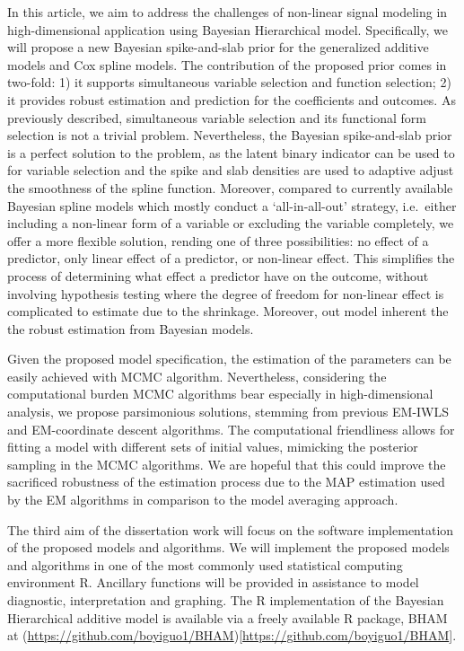 \documentclass[AMA,STIX1COL,]{WileyNJD-v2}
\begin{document}
In this article, we aim to address the challenges of non-linear signal
modeling in high-dimensional application using Bayesian Hierarchical
model. Specifically, we will propose a new Bayesian spike-and-slab prior
for the generalized additive models and Cox spline models. The
contribution of the proposed prior comes in two-fold: 1) it supports
simultaneous variable selection and function selection; 2) it provides
robust estimation and prediction for the coefficients and outcomes. As
previously described, simultaneous variable selection and its functional
form selection is not a trivial problem. Nevertheless, the Bayesian
spike-and-slab prior is a perfect solution to the problem, as the latent
binary indicator can be used to for variable selection and the spike and
slab densities are used to adaptive adjust the smoothness of the spline
function. Moreover, compared to currently available Bayesian spline
models which mostly conduct a `all-in-all-out' strategy, i.e.~either
including a non-linear form of a variable or excluding the variable
completely, we offer a more flexible solution, rending one of three
possibilities: no effect of a predictor, only linear effect of a
predictor, or non-linear effect. This simplifies the process of
determining what effect a predictor have on the outcome, without
involving hypothesis testing where the degree of freedom for non-linear
effect is complicated to estimate due to the shrinkage. Moreover, out
model inherent the the robust estimation from Bayesian models.

Given the proposed model specification, the estimation of the parameters
can be easily achieved with MCMC algorithm. Nevertheless, considering
the computational burden MCMC algorithms bear especially in
high-dimensional analysis, we propose parsimonious solutions, stemming
from previous EM-IWLS \citep{Rockova2014a}and EM-coordinate descent
algorithms\citep{Tang2018, Tang2019}. The computational friendliness
allows for fitting a model with different sets of initial values,
mimicking the posterior sampling in the MCMC algorithms. We are hopeful
that this could improve the sacrificed robustness of the estimation
process due to the MAP estimation used by the EM algorithms in
comparison to the model averaging approach.

The third aim of the dissertation work will focus on the software
implementation of the proposed models and algorithms. We will implement
the proposed models and algorithms in one of the most commonly used
statistical computing environment R. Ancillary functions will be
provided in assistance to model diagnostic, interpretation and graphing.
The R implementation of the Bayesian Hierarchical additive model is
available via a freely available R package, BHAM at
(\url{https://github.com/boyiguo1/BHAM}){[}\url{https://github.com/boyiguo1/BHAM}{]}.
\end{document}

